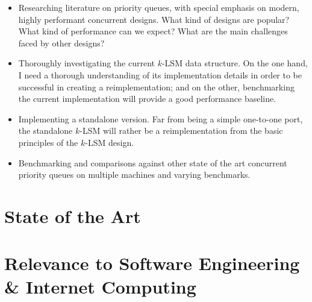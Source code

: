 \documentclass[a4paper,10pt]{article}
\begin{document}
\begin{itemize}
    \item Researching literature on priority queues, with special emphasis on
        modern, highly performant concurrent designs. What kind of designs
        are popular? What kind of performance can we expect? What are the
        main challenges faced by other designs?
    \item Thoroughly investigating the current $k$-LSM data structure. On
        the one hand, I need a thorough understanding of its implementation
        details in order to be successful in creating a reimplementation; and
        on the other, benchmarking the current implementation will provide a
        good performance baseline.
    \item Implementing a standalone version. Far from being a simple one-to-one 
        port, the standalone $k$-LSM will rather be a reimplementation from
        the basic principles of the $k$-LSM design. 
    \item Benchmarking and comparisons against other state of the art concurrent
        priority queues on multiple machines and varying benchmarks.
\end{itemize}

\section{State of the Art}

\section{Relevance to Software Engineering \& Internet Computing}

\nocite{*} %
\printbibliography
\end{document}
